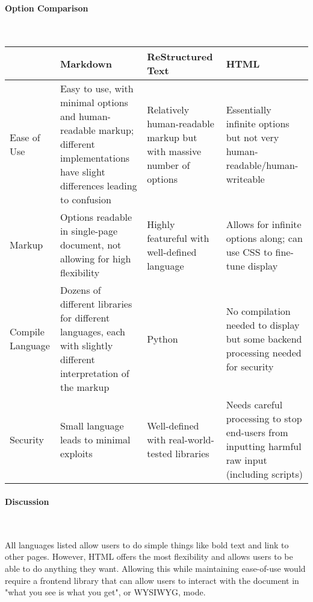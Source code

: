 \documentclass[letterpaper, 10pt, draftclsnofoot, compsoc, onecolumn]{IEEEtran}
\begin{document}
{{ \par}


\paragraph{Option Comparison} ~\\
\vspace{1pc}
\tablehead{}
\begin{supertabular}{|p{2cm}|p{4cm}|p{4cm}|p{4cm}|}
\hline
  & Markdown
  & ReStructured Text
  & HTML \\ \hline
Ease of Use
  & Easy to use, with minimal options and human-readable markup; different implementations have slight differences leading to confusion
  & Relatively human-readable markup but with massive number of options
  & Essentially infinite options but not very human-readable/human-writeable  \\ \hline
Markup
  & Options readable in single-page document, not allowing for high flexibility
  & Highly featureful with well-defined language
  & Allows for infinite options along; can use CSS to fine-tune display \\ \hline
Compile Language
  & Dozens of different libraries for different languages, each with slightly different interpretation of the markup
  & Python
  & No compilation needed to display but some backend processing needed for security \\ \hline
Security
  & Small language leads to minimal exploits
  & Well-defined with real-world-tested libraries
  & Needs careful processing to stop end-users from inputting harmful raw input (including scripts)
  \\ \hline
\end{supertabular}

\vspace{2mm}

\paragraph{Discussion} ~\\
{\noindent
All languages listed allow users to do simple things like bold text and link to other pages. However,
HTML offers the most flexibility and allows users to be able to do anything they want.
Allowing this while maintaining ease-of-use would require a frontend library
that can allow users to interact with the document in "what you see is what you get",
or WYSIWYG, mode.
 \par}

}
\end{document}
